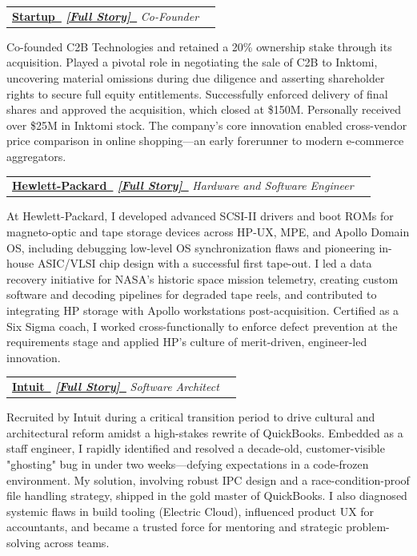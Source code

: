 \documentclass[letterpaper,11pt]{article}
\makeatletter
\newcommand{\faExternalLink}{\faIcon{external-link-alt}}
\renewcommand{\faExternalLink}{\faIcon{external-link-alt}}
\newcommand{\resumeItem}[1]{
    \item\small{
            {#1 \vspace{-2pt}}
    }
}
\newcommand{\resumeSubheading}[4]{
    \vspace{-2pt}\item
    \begin{tabular*}{1.0\textwidth}[t]{l@{\extracolsep{\fill}}r}
    \textbf{#1}  \textit{\small#3} & \textbf{\small #2} \\
    \end{tabular*}\vspace{-7pt}
}
\newcommand{\linkglyph}{{\LinkFont\symbol{"1F517}}}
\makeatother
\begin{document}
    \resumeSubheading
    {\href{https://www.yahoo.com}{Startup~\faExternalLink}
    \quad\small
    \textit{
        \href{https://paul-charlton.vercel.app/story/16}{[Full Story]~{\linkglyph}}}
    }
    {}
    {Co-Founder}
    {Palo Alto, CA}
    \resumeItem{
        Co-founded C2B Technologies and retained a 20\% ownership stake through its acquisition. Played a pivotal role in negotiating the sale of C2B to Inktomi, uncovering material omissions during due diligence and asserting shareholder rights to secure full equity entitlements. Successfully enforced delivery of final shares and approved the acquisition, which closed at \$150M. Personally received over \$25M in Inktomi stock. The company’s core innovation enabled cross-vendor price comparison in online shopping—an early forerunner to modern e-commerce aggregators.
    }




    \resumeSubheading
    {\href{https://www.hp.com}{Hewlett-Packard~\faExternalLink}
    \quad\small
    \textit{
        \href{https://paul-charlton.vercel.app/story/38}{[Full Story]~{\linkglyph}}}
    }
    {}
    {Hardware and Software Engineer}
    {Greeley, CO}
    \resumeItem{
        At Hewlett-Packard, I developed advanced SCSI-II drivers and boot ROMs for magneto-optic and tape storage devices across HP-UX, MPE, and Apollo Domain OS, including debugging low-level OS synchronization flaws and pioneering in-house ASIC/VLSI chip design with a successful first tape-out. I led a data recovery initiative for NASA's historic space mission telemetry, creating custom software and decoding pipelines for degraded tape reels, and contributed to integrating HP storage with Apollo workstations post-acquisition. Certified as a Six Sigma coach, I worked cross-functionally to enforce defect prevention at the requirements stage and applied HP's culture of merit-driven, engineer-led innovation.
    }


    \resumeSubheading
    {\href{https://www.intuit.com}{Intuit~\faExternalLink}
    \quad\small
    \textit{
        \href{https://paul-charlton.vercel.app/story/3}{[Full Story]~{\linkglyph}}}
    }
    {}
    {Software Architect}
    {Greeley, CO}
    \resumeItem{Recruited by Intuit during a critical transition period to drive cultural and architectural reform amidst a high-stakes rewrite of QuickBooks. Embedded as a staff engineer, I rapidly identified and resolved a decade-old, customer-visible "ghosting" bug in under two weeks—defying expectations in a code-frozen environment. My solution, involving robust IPC design and a race-condition-proof file handling strategy, shipped in the gold master of QuickBooks. I also diagnosed systemic flaws in build tooling (Electric Cloud), influenced product UX for accountants, and became a trusted force for mentoring and strategic problem-solving across teams.}
\end{document}

